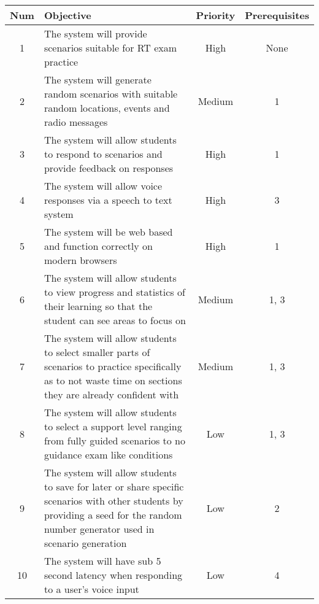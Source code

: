 \begin{center}
    \begin{tabular}{ | c | m{24em} | c | c | }
        \hline
        \bf{Num} & \bf{Objective} & \bf{Priority} & \bf{Prerequisites} \\
        \hline
        1 & The system will provide scenarios suitable for RT exam practice & High & None \\
        \hline
        2 & The system will generate random scenarios with suitable random locations, events and radio messages & Medium & 1 \\
        \hline
        3 & The system will allow students to respond to scenarios and provide feedback on responses & High & 1 \\
        \hline
        4 & The system will allow voice responses via a speech to text system & High & 3 \\
        \hline
        5 & The system will be web based and function correctly on modern browsers & High & 1 \\
        \hline
        6 & The system will allow students to view progress and statistics of their learning so that the student can see areas to focus on & Medium & 1, 3 \\
        \hline
        7 & The system will allow students to select smaller parts of scenarios to practice specifically as to not waste time on sections they are already confident with & Medium & 1, 3 \\
        \hline
        8 & The system will allow students to select a support level ranging from fully guided scenarios to no guidance exam like conditions & Low & 1, 3 \\
        \hline
        9 & The system will allow students to save for later or share specific scenarios with other students by providing a seed for the random number generator used in scenario generation & Low & 2 \\
        \hline
        10 & The system will have sub 5 second latency when responding to a user's voice input & Low & 4 \\
        \hline
    \end{tabular}
\end{center}